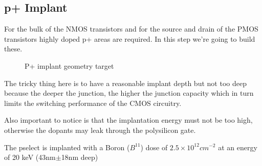 \subsection{p+ Implant}\label{pimplant_chapter}
For the bulk of the NMOS transistors and for the source and drain of the PMOS transistors highly doped  p+ areas are required.
In this step we're going to build these.

\begin{figure}[H]
	\centering
	\begin{tikzpicture}[node distance = 3cm, auto, thick,scale=\CrossAndTopSectionBig, every node/.style={transform shape}]
		
	\end{tikzpicture}
	\caption{P+ implant geometry target}
\end{figure}

The tricky thing here is to have a reasonable implant depth but not too deep because the deeper the junction, the higher the junction capacity which in turn limits the switching performance of the CMOS circuitry.

Also important to notice is that the implantation energy must not be too high, otherwise the dopants may leak through the polysilicon gate.

The pselect is implanted with a Boron ($B^{11}$) dose of $2.5\times10^{12}cm^{-2}$ at an energy of 20 keV  (43nm$\pm$18nm deep)

